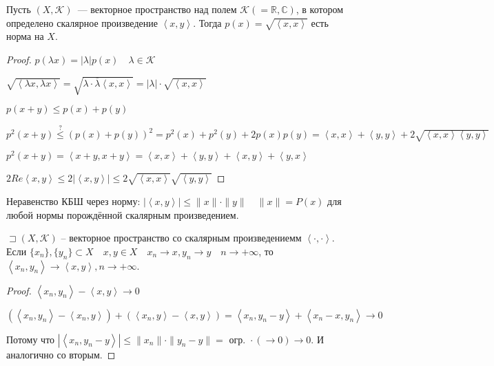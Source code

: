 \documentclass{book}
\newcommand\R{\ensuremath{\mathbb{R}}}
\renewcommand\C{\ensuremath{\mathbb{C}}}
\newcommand{\ov}[1]{\overline{#1}}
\theoremstyle{definition}
\begin{document}
    \begin{statement}
        Пусть $(X, \mathcal{K})$~--- векторное пространство над полем $\mathcal{K}( = \R, \C)$, в котором определено скалярное произведение $ \left< x, y \right>$. 
        Тогда $p(x) = \sqrt{\left< x, x \right>} $ есть норма на $X$.
    \end{statement}
    \begin{proof}
        $p(\lambda x) = |\lambda|p(x)\quad \lambda \in \mathcal{K}$

        $\sqrt{\left< \lambda x, \lambda x \right>} = \sqrt{\lambda \cdot  \ov{\lambda} \left< x, x \right>}  = |\lambda| \cdot \sqrt{\left< x, x \right>} $

        $p(x+y)\leqslant p(x) + p(y)$

        $p^2(x+y) \overset ? {\leqslant} (p(x) + p(y))^2 = p^2(x) + p^2(y) + 2p(x)p(y) = \left< x, x \right> + \left< y, y \right> + 2\sqrt{\left< x, x \right> \left< y, y \right>}$

        $p^2(x+y) = \left< x+y, x+y \right> = \left< x, x \right> + \left< y, y \right> + \left< x, y  \right> + \left< y, x \right>$

        $2 Re\left<x, y \right> \leqslant 2 \left| \left< x,y \right> \right| \leqslant 2\sqrt{\left< x, x \right>} \sqrt{\left< y, y \right>} $
    \end{proof}

    Неравенство КБШ через норму: $\left| \left< x, y \right> \right| \leqslant \|x\| \cdot \|y\|\quad \|x\| = P(x)$ для любой нормы порождённой скалярным произведением.

    \begin{statement}
        $\sqsupset \left( X, \mathcal{K} \right) $ -- векторное пространство со скалярным произведениемм $\left<\cdot , \cdot  \right>$. 
        Если  $\{x_{n} \}, \{y_{n} \} \subset X\quad x, y\in X\quad x_{n} \to x, y_{n} \to y\quad n \to  +\infty$, то  $\left<x_{n} , y_{n}  \right> \to \left< x, y \right>, n\to  +\infty$.
    \end{statement}
    \begin{proof}
        $\left< x_{n} , y_{n}  \right> - \left< x, y \right> \to 0$

        $\left( \left<x_{n} , y_{n}  \right> - \left<x_{n} , y \right> \right)  + \left( \left< x_{n} , y \right> - \left< x, y \right> \right)  = \left< x_{n} , y_{n} -y \right> + \left< x_{n} -x, y_{n}  \right> \to 0$

        Потому что $\left| \left< x_{n} , y_{n} -y \right> \right| \leqslant \|x_{n} \|\cdot \|y_{n} -y\| =  \text{ огр. } \cdot  (\to 0) \to 0$. И аналогично со вторым.
    \end{proof}
\end{document}
